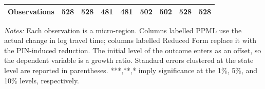 \begin{table}[p]
{{\begin{tabular}{l*{8}{c}}
Observations        &         528         &         528         &         481         &         481         &         502         &         502         &         528         &         528         \\
\hline\hline
\end{tabular}}
}
\usebox{\tabbox}
\begin{minipage}{\wd\tabbox}
    \vspace{0.1cm}
    {\footnotesize \sloppy \textit{Notes: } Each observation is a micro-region. Columns labelled PPML use the actual change in log travel time; columns labelled Reduced Form replace it with the PIN-induced reduction. The initial level of the outcome enters as an offset, so the dependent variable is a growth ratio. Standard errors clustered at the state level are reported in parentheses. ***,**,* imply significance at the 1\%, 5\%, and 10\% levels, respectively.}
\end{minipage}
\endgroup
\end{table}
